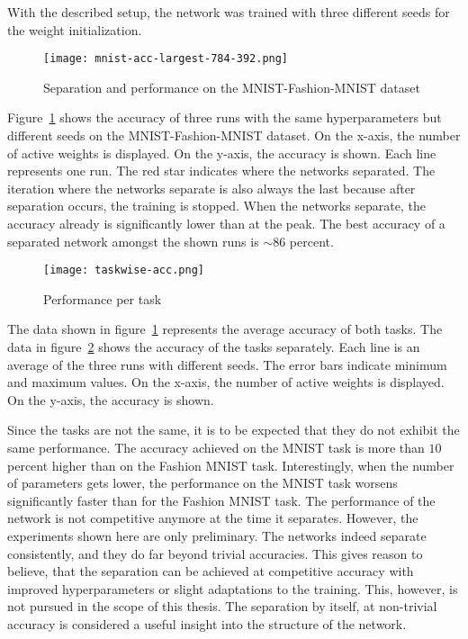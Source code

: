 With the described setup, the network was trained with three different seeds for the weight initialization.
\begin{figure}[ht]
    \centering
    \texttt{[image: mnist-acc-largest-784-392.png]}
    \caption{
        Separation and performance on the MNIST-Fashion-MNIST dataset
    }\label{fig:mnist-acc}
\end{figure}

Figure~\ref{fig:mnist-acc} shows the accuracy of three runs with the same hyperparameters but different seeds on the MNIST-Fashion-MNIST dataset.
On the x-axis, the number of active weights is displayed.
On the y-axis, the accuracy is shown.
Each line represents one run.
The red star indicates where the networks separated.
The iteration where the networks separate is also always the last because after separation occurs, the training is stopped.
When the networks separate, the accuracy already is significantly lower than at the peak.
The best accuracy of a separated network amongst the shown runs is $\sim86$ percent.

\begin{figure}[ht]
    \centering
    \texttt{[image: taskwise-acc.png]}
    \caption{
        Performance per task
    }\label{fig:taskwise-acc}
\end{figure}

The data shown in figure~\ref{fig:mnist-acc} represents the average accuracy of both tasks.
The data in figure~\ref{fig:taskwise-acc} shows the accuracy of the tasks separately.
Each line is an average of the three runs with different seeds.
The error bars indicate minimum and maximum values.
On the x-axis, the number of active weights is displayed.
On the y-axis, the accuracy is shown.

Since the tasks are not the same, it is to be expected that they do not exhibit the same performance.
The accuracy achieved on the MNIST task is more than $10$ percent higher than on the Fashion MNIST task.
Interestingly, when the number of parameters gets lower, the performance on the MNIST task worsens significantly faster than for the Fashion MNIST task.
The performance of the network is not competitive anymore at the time it separates.
However, the experiments shown here are only preliminary.
The networks indeed separate consistently, and they do far beyond trivial accuracies.
This gives reason to believe, that the separation can be achieved at competitive accuracy with improved hyperparameters or slight adaptations to the training.
This, however, is not pursued in the scope of this thesis.
The separation by itself, at non-trivial accuracy is considered a useful insight into the structure of the network.

